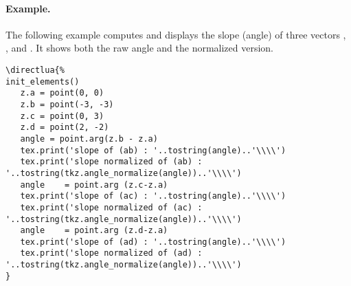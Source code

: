 \paragraph{Example.}
The following example computes and displays the slope (angle) of three vectors , , and . It shows both the raw angle and the normalized version.
\begin{Verbatim}
\directlua{%
init_elements()
   z.a = point(0, 0)
   z.b = point(-3, -3)
   z.c = point(0, 3)
   z.d = point(2, -2)
   angle = point.arg(z.b - z.a)
   tex.print('slope of (ab) : '..tostring(angle)..'\\\\')
   tex.print('slope normalized of (ab) : '..tostring(tkz.angle_normalize(angle))..'\\\\')
   angle    = point.arg (z.c-z.a)
   tex.print('slope of (ac) : '..tostring(angle)..'\\\\')
   tex.print('slope normalized of (ac) : '..tostring(tkz.angle_normalize(angle))..'\\\\')
   angle    = point.arg (z.d-z.a)
   tex.print('slope of (ad) : '..tostring(angle)..'\\\\')
   tex.print('slope normalized of (ad) : '..tostring(tkz.angle_normalize(angle))..'\\\\')
}
\end{Verbatim}

